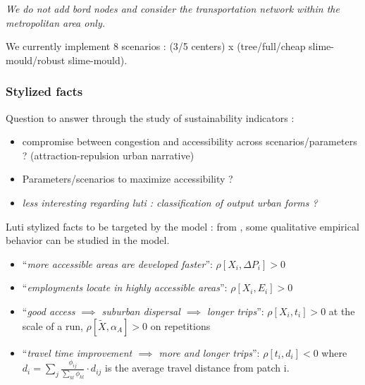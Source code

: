 \textit{We do not add bord nodes and consider the transportation network within the metropolitan area only.}

We currently implement 8 scenarios : (3/5 centers) x (tree/full/cheap slime-mould/robust slime-mould).


\subsubsection{Stylized facts}

Question to answer through the study of sustainability indicators :
\begin{itemize}
  \item compromise between congestion and accessibility across scenarios/parameters ? (attraction-repulsion urban narrative)
  \item Parameters/scenarios to maximize accessibility ?
  \item \textit{less interesting regarding luti : classification of output urban forms ?}
\end{itemize}


Luti stylized facts to be targeted by the model : from \cite{wegener2004land}, some qualitative empirical behavior can be studied in the model.


\begin{itemize}
	\item ``\textit{more accessible areas are developed faster}'': $\rho\left[X_i,\Delta P_i\right] > 0$
	\item ``\textit{employments locate in highly accessible areas}'': $\rho\left[X_i,E_i\right] > 0$
	\item ``\textit{good access $\implies$ suburban dispersal $\implies$ longer trips}'': $\rho\left[X_i,t_i\right] > 0$ at the scale of a run, $\rho\left[\tilde{X},\alpha_A\right] > 0$ on repetitions
	\item ``\textit{travel time improvement $\implies$ more and longer trips}'': $\rho\left[t_i,d_i\right] < 0$ where $d_i = \sum_j \frac{\phi_{ij}}{\sum_{kl} \phi_{kl}} \cdot d_{ij}$ is the average travel distance from patch i.
\end{itemize}




